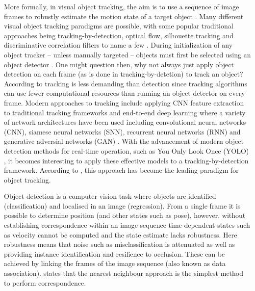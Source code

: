 \documentclass[a4paper,twoside,12pt]{report}
\begin{document}
More formally, in visual object tracking, the aim is to use a sequence of image frames to robustly estimate the motion state of a target object \citep{track1}. Many different visual object tracking paradigms are possible, with some popular traditional approaches being tracking-by-detection, optical flow, silhouette tracking and discriminative correlation filters to name a few \citep{track0}. During initialization of any object tracker -- unless manually targeted -- objects must first be selected using an object detector \citep{tradtrack0}. One might question then, why not always just apply object detection on each frame (as is done in tracking-by-detetion) to track an object? According to \cite{tradtrack5} tracking is less demanding than detection since tracking algorithms can use fewer computational resources than running an object detector on every frame. Modern approaches to tracking include applying CNN feature extraction to traditional tracking frameworks and end-to-end deep learning where a variety of network architectures have been used including convolutional neural networks (CNN), siamese neural networks (SNN), recurrent neural networks (RNN) and generative adversial networks (GAN) \citep{deeptrack1}. With the advancement of modern object detection methods for real-time operation, such as You Only Look Once (YOLO) \citep{yolo}, it becomes interesting to apply these effective models to a tracking-by-detection framework. According to \cite{deepsort}, this approach has become the leading paradigm for object tracking.

Object detection is a computer vision task where objects are identified (classification) and localised in an image (regression). From a single frame it is possible to determine position (and other states such as pose), however, without establishing correspondence within an image sequence time-dependent states such as velocity cannot be computed and the state estimate lacks robustness. Here robustness means that noise such as misclassification is attenuated as well as providing instance identification and resilience to occlusion. These can be achieved by linking the frames of the image sequence (also known as data association). \cite{tradtrack0} states that the nearest neighbour approach is the simplest method to perform correspondence.
\end{document}
